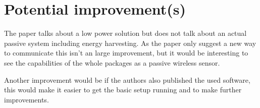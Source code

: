 \documentclass [a4,twoside,11pt] {article}
\begin{document}
\section{Potential improvement(s)}
The paper talks about a low power solution but does not talk about an actual passive system including energy harvesting. As the paper only suggest a new way to communicate this isn't an large improvement, but it would be interesting to see the capabilities of the whole packages as a passive wireless sensor.

Another improvement would be if the authors also published the used software, this would make it easier to get the basic setup running and to make further improvements.
\end{document}
